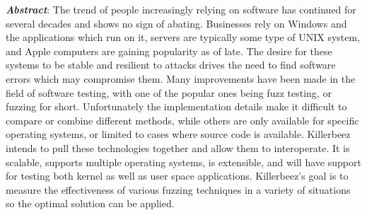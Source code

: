 \textbf{\textit{Abstract}}:
The trend of people increasingly relying on software has continued for
several decades and shows no sign of abating. Businesses rely on Windows and
the applications which run on it, servers are typically some type of UNIX
system, and Apple computers are gaining popularity as of late. The desire
for these systems to be stable and resilient to attacks drives the need to find
software errors which may compromise them. Many improvements have been
made in the field of software testing, with one of the popular ones being fuzz
testing, or fuzzing for short.  Unfortunately the implementation details make
it difficult to compare or combine different methods, while others are only
available for specific operating systems, or limited to cases where source
code is available.  Killerbeez intends to pull these technologies together
and allow them to interoperate. It is scalable, supports multiple operating
systems, is extensible, and will have support for testing both kernel as well
as user space applications. Killerbeez's goal is to measure the effectiveness
of various fuzzing techniques in a variety of situations so the optimal
solution can be applied. 

